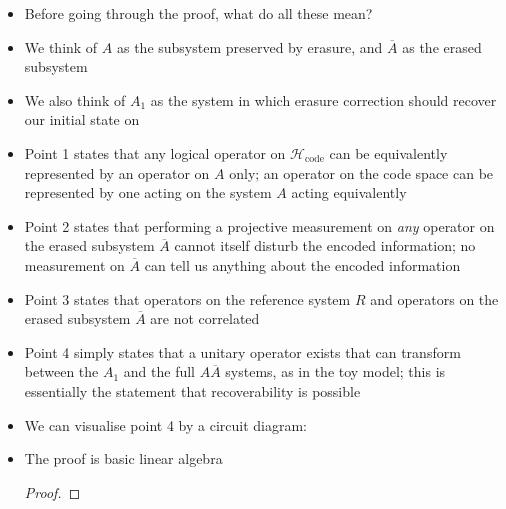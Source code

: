 \documentclass[12pt,a4paper]{article}
\numberwithin{equation}{section}
\newcommand{\Hcode}{\mathcal{H}_{\text{code}}}
\theoremstyle{definition}
\theoremstyle{theorem}
\newtheorem{theorem}{Theorem}[section]
\theoremstyle{example}
\begin{document}
\begin{itemize}
\begin{theorem}[Harlow 1]
\begin{enumerate}
				\begin{equation}
					\ket{i_{L}}_{A\overline{A}}=U_{A}\left(\ket{i}_{A_{1}}\otimes\ket{\chi}_{A_{2}\overline{A}}\right)
				\end{equation}
				where $\{\ket{i}_{A_{1}}\}$ is an orthonormal basis of $\mathcal{H}_{A_{1}}$.
			\end{enumerate}
		\end{theorem}
		\item Before going through the proof, what do all these mean?
		\item We think of $A$ as the subsystem preserved by erasure, and $\overline{A}$ as the erased subsystem
		\item We also think of $A_{1}$ as the system in which erasure correction should recover our initial state on
		\item Point 1 states that any logical operator on $\Hcode$ can be equivalently represented by an operator on $A$ only; an operator on the code space can be represented by one acting on the system $A$ acting equivalently
		\item Point 2 states that performing a projective measurement on \textit{any} operator on the erased subsystem $\overline{A}$ cannot itself disturb the encoded information; no measurement on $\overline{A}$ can tell us anything about the encoded information
		\item Point 3 states that operators on the reference system $R$ and operators on the erased subsystem $\overline{A}$ are not correlated
		\item Point 4 simply states that a unitary operator exists that can transform between the $A_{1}$ and the full $A\overline{A}$ systems, as in the toy model; this is essentially the statement that recoverability is possible
		\item We can visualise point 4 by a circuit diagram:
		\begin{figure}[H] 
			\centering
		\end{figure}
		\item The proof is basic linear algebra
		\newcommand{\Xabar}{X_{\overline{A}}}
		\begin{proof}

\end{proof}
\end{itemize}
\end{document}
